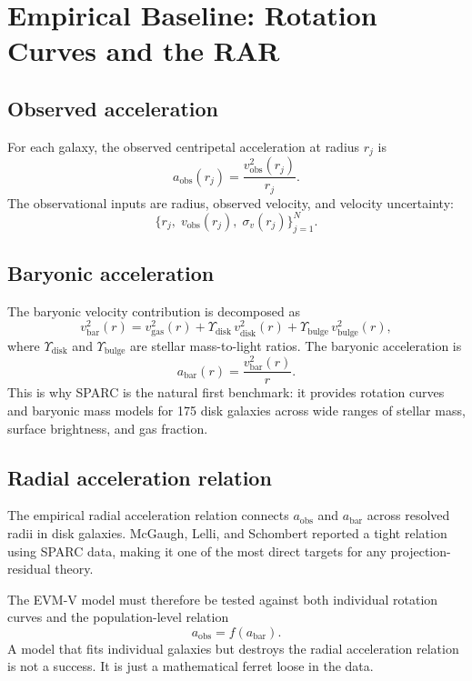 \documentclass[11pt,a4paper,oneside]{article}
\newcommand{\aobs}{a_{\mathrm{obs}}}
\newcommand{\abar}{a_{\mathrm{bar}}}
\newcommand{\vobs}{v_{\mathrm{obs}}}
\newcommand{\vbar}{v_{\mathrm{bar}}}
\newcommand{\vgas}{v_{\mathrm{gas}}}
\newcommand{\vdisk}{v_{\mathrm{disk}}}
\newcommand{\vbulge}{v_{\mathrm{bulge}}}
\newcommand{\Upsdisk}{\Upsilon_{\mathrm{disk}}}
\newcommand{\Upsbulge}{\Upsilon_{\mathrm{bulge}}}
\begin{document}
\section{Empirical Baseline: Rotation Curves and the RAR}

\subsection{Observed acceleration}

For each galaxy, the observed centripetal acceleration at radius $r_j$ is
\[
    \aobs(r_j) = \frac{\vobs^2(r_j)}{r_j}.
\]
The observational inputs are radius, observed velocity, and velocity uncertainty:
\[
    \bigl\{r_j,\;\vobs(r_j),\;\sigma_v(r_j)\bigr\}_{j=1}^{N}.
\]

\subsection{Baryonic acceleration}

The baryonic velocity contribution is decomposed as
\[
    \vbar^2(r) = \vgas^2(r) + \Upsdisk\,\vdisk^2(r) + \Upsbulge\,\vbulge^2(r),
\]
where $\Upsdisk$ and $\Upsbulge$ are stellar mass-to-light ratios. The baryonic
acceleration is
\[
    \abar(r) = \frac{\vbar^2(r)}{r}.
\]
This is why SPARC is the natural first benchmark: it provides rotation curves and
baryonic mass models for 175 disk galaxies across wide ranges of stellar mass, surface
brightness, and gas fraction.

\subsection{Radial acceleration relation}

The empirical radial acceleration relation connects $\aobs$ and $\abar$ across resolved
radii in disk galaxies. McGaugh, Lelli, and Schombert reported a tight relation using
SPARC data, making it one of the most direct targets for any projection-residual theory.

The EVM-V model must therefore be tested against both individual rotation curves and
the population-level relation
\[
    \aobs = f(\abar).
\]
A model that fits individual galaxies but destroys the radial acceleration relation is
not a success. It is just a mathematical ferret loose in the data.

\end{document}
